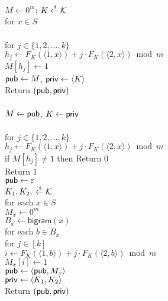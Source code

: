 \begin{figure}[tp]
\centering
{}
{
\\
$M \gets 0^m$; $K {\:\stackrel{{\scriptscriptstyle \hspace{0.2em}\$}} {\leftarrow}\:} {\cal K}$\\
for $x \in S$\\
\\
\nudge for $j \in \{1,2,\ldots,k\}$\\
\nudge\nudge $h_j \gets F_{K}(\langle 1,x \rangle) + j\cdot F_{K}(\langle 2,x \rangle) \bmod m$\\
\nudge\nudge $M[h_j] \gets 1$\\
${\sf pub} \gets M$, ${\sf priv} \gets \langle K \rangle$\\
Return $({\sf pub},{\sf priv})$\\

\medskip
{}\\
$M\gets{\sf pub}$, $K \gets {\sf priv}$\\
 \\
for $j \in \{1,2,\ldots,k\}$\\
\nudge $h_j \gets F_{K}(\langle 1,x \rangle) + j\cdot F_{K}(\langle 2,x\rangle) \bmod m$\\
\nudge if $M[h_j] \neq 1$ then Return 0\\
Return 1
}
{
\\
${\sf pub} \gets \varepsilon$\\
$K_1,K_2, {\:\stackrel{{\scriptscriptstyle \hspace{0.2em}\$}} {\leftarrow}\:} {\cal K}$\\
for each $x \in S$\\
\nudge $M_x \gets 0^m$\\
\nudge $B_x \gets \mathsf{bigram}(x)$\\
\nudge for each $b \in B_x$\\
\nudge\nudge for $j \in [k]$\\
\nudge\nudge\nudge $i \gets F_{K}(\langle 1, b\rangle)+j\cdot
F_{K}(\langle 2, b  \rangle) \bmod m$\\
\nudge\nudge\nudge $M_x[i] \gets 1$\\
\nudge ${\sf pub} \gets \langle{\sf pub}, M_x \rangle$\\
${\sf priv} \gets \langle K_1,K_2 \rangle$\\
Return $({\sf pub},{\sf priv})$\\

}
\end{figure}
